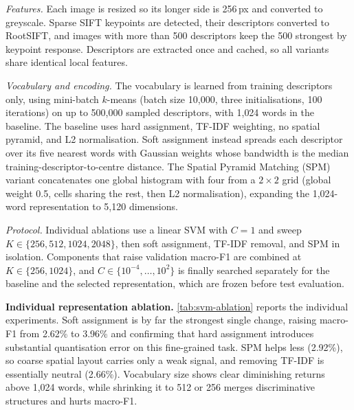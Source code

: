 \emph{Features.} Each image is resized so its longer side is 256\,px and converted to greyscale. Sparse SIFT keypoints are detected, their descriptors converted to RootSIFT, and images with more than 500 descriptors keep the 500 strongest by keypoint response. Descriptors are extracted once and cached, so all variants share identical local features.
 
\emph{Vocabulary and encoding.} The vocabulary is learned from training descriptors only, using mini-batch $k$-means (batch size 10{,}000, three initialisations, 100 iterations) on up to 500{,}000 sampled descriptors, with 1{,}024 words in the baseline. The baseline uses hard assignment, TF-IDF weighting, no spatial pyramid, and L2 normalisation. Soft assignment instead spreads each descriptor over its five nearest words with Gaussian weights whose bandwidth is the median training-descriptor-to-centre distance. The Spatial Pyramid Matching (SPM) variant concatenates one global histogram with four from a $2\times2$ grid (global weight 0.5, cells sharing the rest, then L2 normalisation), expanding the 1{,}024-word representation to 5{,}120 dimensions.
 
\emph{Protocol.} Individual ablations use a linear SVM with $C=1$ and sweep $K\in\{256,512,1024,2048\}$, then soft assignment, TF-IDF removal, and SPM in isolation. Components that raise validation macro-F1 are combined at $K\in\{256,1024\}$, and $C\in\{10^{-4},\dots,10^{2}\}$ is finally searched separately for the baseline and the selected representation, which are frozen before test evaluation.
 
\textbf{Individual representation ablation.}
\cref{tab:svm-ablation} reports the individual experiments. Soft assignment is by far the strongest single change, raising macro-F1 from 2.62\% to 3.96\% and confirming that hard assignment introduces substantial quantisation error on this fine-grained task. SPM helps less (2.92\%), so coarse spatial layout carries only a weak signal, and removing TF-IDF is essentially neutral (2.66\%). Vocabulary size shows clear diminishing returns above 1{,}024 words, while shrinking it to 512 or 256 merges discriminative structures and hurts macro-F1.
 

